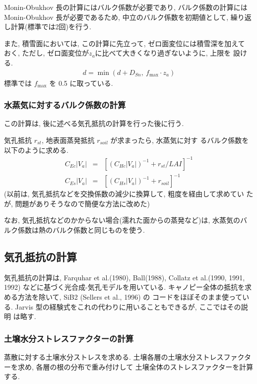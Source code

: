 Monin-Obukhov 長の計算にはバルク係数が必要であり, バルク係数の計算には
Monin-Obukhov 長が必要であるため, 中立のバルク係数を初期値として, 繰り返
し計算(標準では2回)を行う. 

また, 積雪面においては, この計算に先立って, ゼロ面変位には積雪深を加えて
おく, ただし, ゼロ面変位が$z_a$に比べて大きくなり過ぎないように, 上限を
設ける. 
\begin{eqnarray}
 d = \min( d + D_{Sn} ,\  f_{\max} \cdot z_a )
\end{eqnarray}
標準では $f_{\max}$ を 0.5 に取っている. 

\subsubsection{水蒸気に対するバルク係数の計算}

この計算は, 後に述べる気孔抵抗の計算を行った後に行う. 

気孔抵抗 $r_{st}$, 地表面蒸発抵抗 $r_{soil}$ が求まったら, 水蒸気に対す
るバルク係数を以下のように求める. 
\begin{eqnarray}
 C_{Ec} |V_a| &=& \left[ (C_{Hc} |V_a|)^{-1} + r_{st} / LAI\right]^{-1} \\
 C_{Es} |V_a| &=& \left[ (C_{Hs} |V_a|)^{-1} + r_{soil}\right]^{-1}
\end{eqnarray}
(以前は, 気孔抵抗などを交換係数の減少に換算して, 粗度を経由して求めてい
たが, 問題がありそうなので簡便な方法に改めた)

なお, 気孔抵抗などのかからない場合(濡れた面からの蒸発など)は, 水蒸気のバ
ルク係数は熱のバルク係数と同じものを使う. 

\subsection{気孔抵抗の計算}

気孔抵抗の計算は, Farquhar et al.(1980), Ball(1988), Collatz et
al.(1990, 1991, 1992) などに基づく光合成-気孔モデルを用いている. 
キャノピー全体の抵抗を求める方法を除いて, SiB2 (Sellers et al., 1996) の
コードをほぼそのまま使っている. 
Jarvis 型の経験式をこれの代わりに用いることもできるが, ここではその説明
は略す. 

\subsubsection{土壌水分ストレスファクターの計算}

蒸散に対する土壌水分ストレスを求める. 
土壌各層の土壌水分ストレスファクターを求め, 各層の根の分布で重み付けして
土壌全体のストレスファクターを計算する. 

